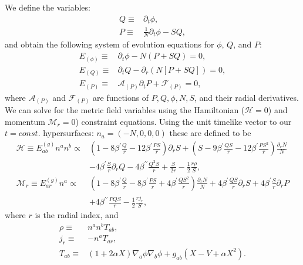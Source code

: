 \documentclass[a4paper,11pt]{article}
\begin{document}
   We define the variables:
\begin{subequations}
\begin{align}
   Q
   \equiv&
   \partial_t\phi
   ,\\
   P
   \equiv&
   \frac{1}{N}\partial_t\phi-S Q
   ,
\end{align}
\end{subequations}
   and obtain the following system of evolution equations for
$\phi$, $Q$, and $P$:
\begin{subequations}
\begin{align}
   E_{(\phi)}
   \equiv&
   \partial_t\phi
-  N\left(P+S Q\right)
   = 0
   ,\\
   E_{(Q)}
   \equiv&
   \partial_tQ
-  \partial_r\left(N\left[P+S Q\right]\right)
   = 0
   ,\\
   E_{(P)}
   \equiv&
   \mathcal{A}_{(P)}\partial_tP
+  \mathcal{F}_{(P)}
   = 0
   ,
\end{align}
\end{subequations}
   where $\mathcal{A}_{(P)}$ and $\mathcal{F}_{(P)}$
are functions of $P,Q,\phi,N,S$, and their radial derivatives. 
We can solve for the metric field variables using the
Hamiltonian ($\mathcal{H}=0$) and momentum $\mathcal{M}_r=0$)
constraint equations.
Using the unit timelike vector to our $t=const.$ hypersurfaces:
$n_a=(-N,0,0,0)$ these are defined to be 
\begin{align}
\label{eq:metric_field_odes}
   \mathcal{H}
   \equiv
   E^{(g)}_{ab}n^an^b
   \propto&
   \left(
      1
   -  8\beta^{\prime}\frac{Q}{r}
   -  12\beta^{\prime}\frac{P S}{r}
   \right)
   \partial_rS
+  \left(
      S
   -  9\beta^{\prime}\frac{QS}{r}
   -  12\beta^{\prime}\frac{PS^2}{r}
   \right)
   \frac{\partial_rN}{N}
   \nonumber\\&
-  4\beta^{\prime}\frac{S}{r}\partial_rQ  
-  4\beta^{\prime\prime}\frac{Q^2S}{r}
+  \frac{S}{2r}
-  \frac{1}{2}\frac{r\rho}{S}
   ,\\
   \mathcal{M}_r
   \equiv
   E^{(g)}_{ar}n^a
   \propto&
   \left(
      1
   -  8\beta^{\prime}\frac{Q}{r}
   -  8\beta^{\prime}\frac{PS}{r}
   +  4\beta^{\prime}\frac{QS^2}{r}
   \right)
   \frac{\partial_rN}{N}
+  4\beta^{\prime}\frac{QS}{r}\partial_rS
+  4\beta^{\prime}\frac{S}{r}\partial_rP
   \nonumber\\&
+  4\beta^{\prime\prime}\frac{P Q S}{r}
-  \frac{1}{2}\frac{r j_r}{S}
   ,
\end{align}
   where $r$ is the radial index, and
\begin{subequations}
\begin{align}
   \rho
   \equiv&
   n^an^bT_{ab}
   ,\\
   j_r
   \equiv&
-  n^aT_{ar}
   ,\\
   T_{ab}
   \equiv&
   \left(
      1+ 2 \alpha X
   \right)
   \nabla_a\phi\nabla_b\phi
+  g_{ab}
   \left(
      X
   -  V 
   +  \alpha X^2
   \right)
   .
\end{align}
\end{subequations}
\end{document}
